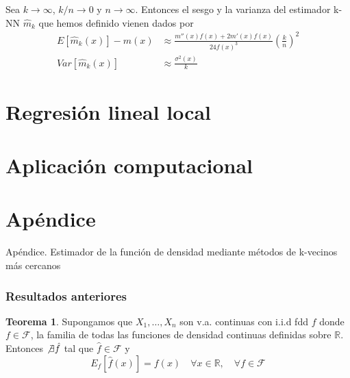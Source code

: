 \documentclass{beamer}
\theoremstyle{definition}
\newtheorem{teorema}{Teorema}
\newcommand{\R}{\mathbb{R}}
\begin{document}
\begin{frame}
\begin{theorem}[Lai, 1997] 
Sea $k\to \infty$, $k/n\to 0$ y $n\to \infty$. Entonces el sesgo y la varianza del estimador k-NN $\hat{m}_k$ que hemos definido vienen dados por
\begin{align*}
E[\hat{m}_k(x)]-m(x) &\approx \frac{m''(x)f(x)+2m'(x)f(x)}{24f(x)^3}\left(\frac{k}{n}\right)^2\\
Var[\hat{m}_k(x)] &\approx \frac{\sigma^2(x)}{k}
\end{align*}

\end{theorem}
\end{frame}



\section{Regresión lineal local}
\begin{frame}

\end{frame}
\section{Aplicación computacional}

\begin{frame}

\end{frame}

\section{Apéndice}

\begin{frame}
\begin{center}
\huge{Apéndice. Estimador de la función de densidad mediante métodos de k-vecinos más cercanos}
\end{center}
\end{frame}

\begin{frame}
\frametitle{Resultados anteriores}
\begin{teorema}
Supongamos que $X_1,\dotsc,X_n$ son v.a. continuas con i.i.d fdd $f$ donde $f\in \mathcal{F}$, la familia de todas las funciones de densidad continuas definidas sobre $\R$. Entonces $\not\exists\hat{f}$ tal que $\hat{f}\in \mathcal{F}$ y 
$$
E_f[\hat{f}(x)]=f(x) \quad \forall x \in \R, \quad \forall f \in\mathcal{F}
$$
\end{teorema}
\end{frame}
\end{document}
